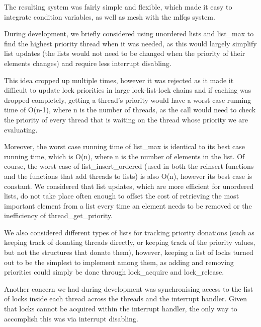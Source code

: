 The resulting system was fairly simple and flexible, which made it easy to integrate condition variables, as well as mesh with the mlfqs system.


During development, we briefly considered using unordered lists and list_max to find the highest priority thread when it was needed, as this would largely simplify list updates (the lists would not need to be changed when the priority of their elements changes) and require less interrupt disabling.

This idea cropped up multiple times, however it was rejected as it made it difficult to update lock priorities in large lock-list-lock chains and if caching was dropped completely, getting a thread's priority would have a worst case running time of O(n-1), where n is the number of threads, as the call would need to check the priority of every thread that is waiting on the thread whose priority we are evaluating.

Moreover, the worst case running time of list_max is identical to its best case running time, which is O(n), where n is the number of elements in the list.
Of course, the worst case of list_insert_ordered (used in both the reinsert functions and the functions that add threads to lists) is also O(n), however its best case is constant.
We considered that list updates, which are more efficient for unordered lists, do not take place often enough to offset the cost of retrieving the most important element from a list every time an element needs to be removed or the inefficiency of thread_get_priority.

We also considered different types of lists for tracking priority donations (such as keeping track of donating threads directly, or keeping track of the priority values, but not the structures that donate them), however, keeping a list of locks turned out to be the simplest to implement among them, as adding and removing priorities could simply be done through lock_acquire and lock_release.

Another concern we had during development was synchronising access to the list of locks inside each thread across the threads and the interrupt handler. Given that locks cannot be acquired within the interrupt handler, the only way to accomplish this was via interrupt disabling.
